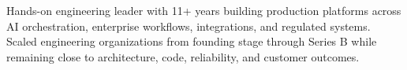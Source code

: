 
Hands-on engineering leader with 11+ years building production platforms across
AI orchestration, enterprise workflows, integrations, and regulated systems.
Scaled engineering organizations from founding stage through Series B while
remaining close to architecture, code, reliability, and customer outcomes.
